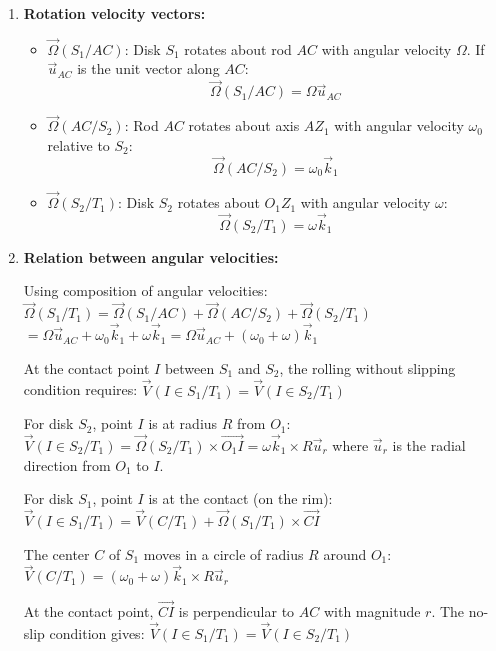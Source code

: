 \documentclass[12pt]{article}
\begin{document}
\begin{correctionbox}
\begin{enumerate}
    \item \textbf{Rotation velocity vectors:}
    
    \begin{itemize}
        \item $\vec{\Omega}(S_1/AC)$: Disk $S_1$ rotates about rod $AC$ with angular velocity $\Omega$. If $\vec{u}_{AC}$ is the unit vector along $AC$:
        $$\vec{\Omega}(S_1/AC) = \Omega \vec{u}_{AC}$$
        
        \item $\vec{\Omega}(AC/S_2)$: Rod $AC$ rotates about axis $AZ_1$ with angular velocity $\omega_0$ relative to $S_2$:
        $$\vec{\Omega}(AC/S_2) = \omega_0 \vec{k}_1$$
        
        \item $\vec{\Omega}(S_2/T_1)$: Disk $S_2$ rotates about $O_1Z_1$ with angular velocity $\omega$:
        $$\vec{\Omega}(S_2/T_1) = \omega \vec{k}_1$$
    \end{itemize}
    
    \item \textbf{Relation between angular velocities:}
    
    Using composition of angular velocities:
    $\vec{\Omega}(S_1/T_1) = \vec{\Omega}(S_1/AC) + \vec{\Omega}(AC/S_2) + \vec{\Omega}(S_2/T_1)$
    $= \Omega \vec{u}_{AC} + \omega_0 \vec{k}_1 + \omega \vec{k}_1 = \Omega \vec{u}_{AC} + (\omega_0 + \omega) \vec{k}_1$
    
    At the contact point $I$ between $S_1$ and $S_2$, the rolling without slipping condition requires:
    $\vec{V}(I \in S_1/T_1) = \vec{V}(I \in S_2/T_1)$
    
    For disk $S_2$, point $I$ is at radius $R$ from $O_1$:
    $\vec{V}(I \in S_2/T_1) = \vec{\Omega}(S_2/T_1) \times \overrightarrow{O_1I} = \omega \vec{k}_1 \times R\vec{u}_r$
    where $\vec{u}_r$ is the radial direction from $O_1$ to $I$.
    
    For disk $S_1$, point $I$ is at the contact (on the rim):
    $\vec{V}(I \in S_1/T_1) = \vec{V}(C/T_1) + \vec{\Omega}(S_1/T_1) \times \overrightarrow{CI}$
    
    The center $C$ of $S_1$ moves in a circle of radius $R$ around $O_1$:
    $\vec{V}(C/T_1) = (\omega_0 + \omega) \vec{k}_1 \times R\vec{u}_r$
    
    At the contact point, $\overrightarrow{CI}$ is perpendicular to $AC$ with magnitude $r$. The no-slip condition gives:
    $\vec{V}(I \in S_1/T_1) = \vec{V}(I \in S_2/T_1)$
    

\end{enumerate}
\end{correctionbox}
\end{document}
